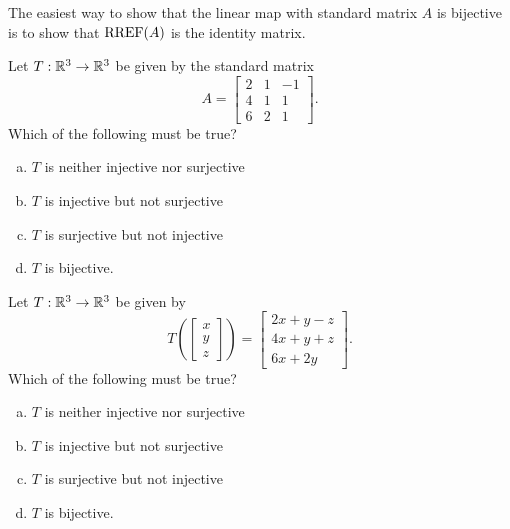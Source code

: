 \begin{applicationActivities}
\begin{observation}
  The easiest way to show that the linear map with standard matrix \(A\)
  is bijective is to show that \(\operatorname{RREF}(A)\) is the identity matrix.
\end{observation}

\begin{activity}{3}
Let $T: \mathbb{R}^3 \rightarrow \mathbb{R}^3$ be given by the standard matrix $$A=\begin{bmatrix} 2&1&-1 \\ 4&1&1 \\ 6&2&1\end{bmatrix}.$$ Which of the following must be true?
\begin{enumerate}[(a)]
\item $T$ is neither injective nor surjective
\item $T$ is injective but not surjective
\item $T$ is surjective but not injective
\item $T$ is bijective.
\end{enumerate}
\end{activity}

\begin{activity}{3}
Let $T: \mathbb{R}^3 \rightarrow \mathbb{R}^3$ be given by $$T\left(\begin{bmatrix} x \\ y  \\ z \end{bmatrix} \right) = \begin{bmatrix} 2x+y-z \\ 4x+y+z \\ 6x+2y\end{bmatrix}.$$   Which of the following must be true?
\begin{enumerate}[(a)]
\item $T$ is neither injective nor surjective
\item $T$ is injective but not surjective
\item $T$ is surjective but not injective
\item $T$ is bijective.
\end{enumerate}
\end{activity}


\end{applicationActivities}
